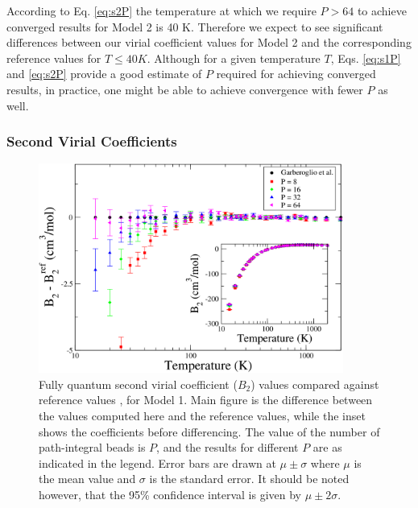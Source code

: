             According to Eq. \eqref{eq:s2P} the temperature at which we require $P > 64$ to achieve converged results for Model 2 is 40 K. Therefore we expect to see significant differences between our virial coefficient values for Model 2 and the corresponding reference values for $T \le 40 K$. Although for a given temperature $T$, Eqs. \eqref{eq:s1P} and \eqref{eq:s2P} provide a good estimate of $P$ required for achieving converged results, in practice, one might be able to achieve convergence with fewer $P$ as well.

            \subsubsection{Second Virial Coefficients}
                \begin{figure}[!htbp]
                    \centering
                    \includegraphics[width=10cm,keepaspectratio]{Chapter-4/Figures/s1GarberoglioAll.png}
                    \caption{Fully quantum second virial coefficient ($B_2$) values compared against reference values \cite{Garberoglio2014}, for Model 1. Main figure is the difference between the values computed here and the reference values, while the inset shows the coefficients before differencing. The value of the number of path-integral beads is $P$, and the results for different $P$ are as indicated in the legend. Error bars are drawn at $\mu \pm \sigma$ where $\mu$ is the mean value and $\sigma$ is the standard error. It should be noted however, that the 95\% confidence interval is given by $\mu \pm 2\sigma$.}
                    \label{fig:r0}
                \end{figure}
